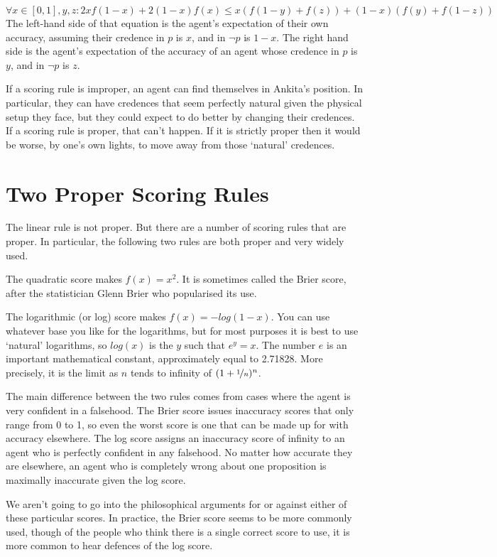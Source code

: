 \begin{equation*}
\forall x \in [0,1], y, z: 2xf(1-x) + 2(1-x)f(x) \leq x(f(1-y)+f(z)) + (1-x)(f(y)+f(1-z))
\end{equation*}
The left-hand side of that equation is the agent's expectation of their own accuracy, assuming their credence in $p$ is $x$, and in $\neg p$ is $1-x$. The right hand side is the agent's expectation of the accuracy of an agent whose credence in $p$ is $y$, and in $\neg p$ is $z$.

If a scoring rule is improper, an agent can find themselves in Ankita's position. In particular, they can have credences that seem perfectly natural given the physical setup they face, but they could expect to do better by changing their credences. If a scoring rule is proper, that can't happen. If it is strictly proper then it would be worse, by one's own lights, to move away from those `natural' credences.

\section{Two Proper Scoring Rules}
The linear rule is not proper. But there are a number of scoring rules that are proper. In particular, the following two rules are both proper and very widely used.

The quadratic score makes $f(x) = x^2$. It is sometimes called the Brier score, after the statistician Glenn Brier who popularised its use.

The logarithmic (or log) score makes $f(x) = -log(1-x)$. You can use whatever base you like for the logarithms, but for most purposes it is best to use `natural' logarithms, so $log(x)$ is the $y$ such that $e^y = x$. The number $e$ is an important mathematical constant, approximately equal to 2.71828. More precisely, it is the limit as $n$ tends to infinity of $(1 + \nicefrac{1}{n})^n$.

The main difference between the two rules comes from cases where the agent is very confident in a falsehood. The Brier score issues inaccuracy scores that only range from 0 to 1, so even the worst score is one that can be made up for with accuracy elsewhere. The log score assigns an inaccuracy score of infinity to an agent who is perfectly confident in any falsehood. No matter how accurate they are elsewhere, an agent who is completely wrong about one proposition is maximally inaccurate given the log score.

We aren't going to go into the philosophical arguments for or against either of these particular scores. In practice, the Brier score seems to be more commonly used, though of the people who think there is a single correct score to use, it is more common to hear defences of the log score.

